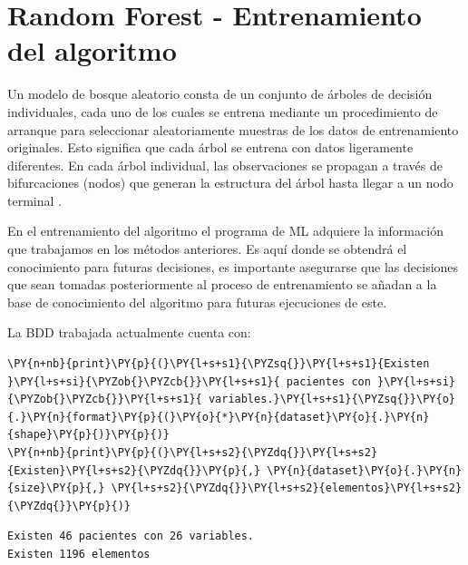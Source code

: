     \hypertarget{random-forest---entrenamiento-del-algoritmo}{%
\section{Random Forest - Entrenamiento del
algoritmo}\label{random-forest---entrenamiento-del-algoritmo}}

Un modelo de bosque aleatorio consta de un conjunto de árboles de
decisión individuales, cada uno de los cuales se entrena mediante un
procedimiento de arranque para seleccionar aleatoriamente muestras de
los datos de entrenamiento originales. Esto significa que cada árbol se
entrena con datos ligeramente diferentes. En cada árbol individual, las
observaciones se propagan a través de bifurcaciones (nodos) que generan
la estructura del árbol hasta llegar a un nodo terminal \cite{cien2001}.

En el entrenamiento del algoritmo el programa de ML
adquiere la información que trabajamos en los métodos anteriores. Es
aquí donde se obtendrá el conocimiento para futuras decisiones, es
importante asegurarse que las decisiones que sean tomadas posteriormente
al proceso de entrenamiento se añadan a la base de conocimiento del
algoritmo para futuras ejecuciones de este.

La BDD trabajada actualmente cuenta con:

    \begin{tcolorbox}[breakable, size=fbox, boxrule=1pt, pad at break*=1mm,colback=cellbackground, colframe=cellborder]
\begin{Verbatim}[commandchars=\\\{\}]
\PY{n+nb}{print}\PY{p}{(}\PY{l+s+s1}{\PYZsq{}}\PY{l+s+s1}{Existen }\PY{l+s+si}{\PYZob{}\PYZcb{}}\PY{l+s+s1}{ pacientes con }\PY{l+s+si}{\PYZob{}\PYZcb{}}\PY{l+s+s1}{ variables.}\PY{l+s+s1}{\PYZsq{}}\PY{o}{.}\PY{n}{format}\PY{p}{(}\PY{o}{*}\PY{n}{dataset}\PY{o}{.}\PY{n}{shape}\PY{p}{)}\PY{p}{)}
\PY{n+nb}{print}\PY{p}{(}\PY{l+s+s2}{\PYZdq{}}\PY{l+s+s2}{Existen}\PY{l+s+s2}{\PYZdq{}}\PY{p}{,} \PY{n}{dataset}\PY{o}{.}\PY{n}{size}\PY{p}{,} \PY{l+s+s2}{\PYZdq{}}\PY{l+s+s2}{elementos}\PY{l+s+s2}{\PYZdq{}}\PY{p}{)}
\end{Verbatim}
\end{tcolorbox}

    \begin{Verbatim}[commandchars=\\\{\}]
Existen 46 pacientes con 26 variables.
Existen 1196 elementos
    \end{Verbatim}


